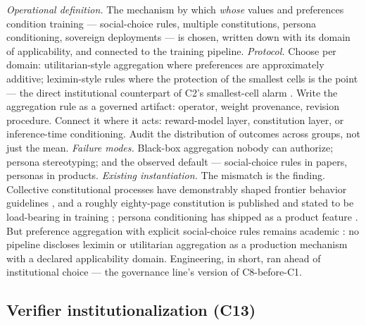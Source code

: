 \documentclass[10pt]{article}
\begin{document}
\emph{Operational definition.} The mechanism by which \emph{whose} values and preferences condition training --- social-choice rules, multiple constitutions, persona conditioning, sovereign deployments --- is chosen, written down with its domain of applicability, and connected to the training pipeline. \emph{Protocol.} Choose per domain: utilitarian-style aggregation where preferences are approximately additive; leximin-style rules where the protection of the smallest cells is the point --- the direct institutional counterpart of C2's smallest-cell alarm \cite{ref52}. Write the aggregation rule as a governed artifact: operator, weight provenance, revision procedure. Connect it where it acts: reward-model layer, constitution layer, or inference-time conditioning. Audit the distribution of outcomes across groups, not just the mean. \emph{Failure modes.} Black-box aggregation nobody can authorize; persona stereotyping; and the observed default --- social-choice rules in papers, personas in products. \emph{Existing instantiation.} The mismatch is the finding. Collective constitutional processes have demonstrably shaped frontier behavior guidelines \cite{ref53}, and a roughly eighty-page constitution is published and stated to be load-bearing in training \cite{ref54}; persona conditioning has shipped as a product feature \cite{ref55}. But preference aggregation with explicit social-choice rules remains academic \cite{ref52}: no pipeline discloses leximin or utilitarian aggregation as a production mechanism with a declared applicability domain. Engineering, in short, ran ahead of institutional choice --- the governance line's version of C8-before-C1.

\subsection{Verifier institutionalization (C13)}
\end{document}
